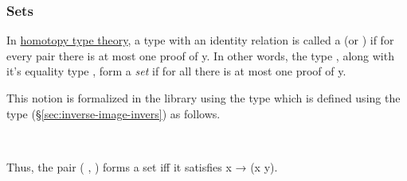 \subsubsection{Sets}\label{sec:sets}
In \href{https://homotopytypetheory.org}{homotopy type theory}, a type  with an identity relation  is called a  (or ) if for every pair   there is at most one proof of   \ab y. In other words, the type , along with it's equality type , form a \emph{set} if for all   there is at most one proof of   \ab y.

This notion is formalized in the \typetopology library using the type  which is defined using the  type (\S\ref{sec:inverse-image-invers}) as follows.
\ccpad
\begin{code}%
\>[1]\AgdaSpace{}%
\AgdaSymbol{:}\AgdaSpace{}%
\AgdaSpace{}%
\AgdaSpace{}%
\AgdaSpace{}%
\AgdaSpace{}%
\<%
\\
%
\>[1]\AgdaSpace{}%
\AgdaSpace{}%
\AgdaSymbol{=}\AgdaSpace{}%
\AgdaSymbol{(}\AgdaSpace{}%
\AgdaSpace{}%
\AgdaSymbol{:}\AgdaSpace{}%
\AgdaSymbol{)}\AgdaSpace{}%
\AgdaSpace{}%
\AgdaSpace{}%
\AgdaSymbol{(}\AgdaSpace{}%
\AgdaSpace{}%
\AgdaSymbol{)}\<%
\end{code}
\ccpad
Thus, the pair ( , ) forms a set iff it satisfies  \ab x  \as →  (\ab x  \ab y).

